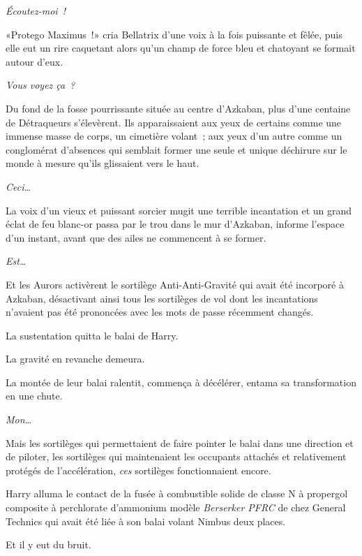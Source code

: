\emph{Écoutez-moi~!}

«Protego Maximus~!» cria Bellatrix d'une voix à la fois puissante et fêlée, puis elle eut un rire caquetant alors qu'un champ de force bleu et chatoyant se formait autour d'eux.

\emph{Vous voyez ça~?}

Du fond de la fosse pourrissante située au centre d'Azkaban, plus d'une centaine de Détraqueurs s'élevèrent. Ils apparaissaient aux yeux de certains comme une immense masse de corps, un cimetière volant~; aux yeux d'un autre comme un conglomérat d'absences qui semblait former une seule et unique déchirure sur le monde à mesure qu'ils glissaient vers le haut.

\emph{Ceci…}

La voix d'un vieux et puissant sorcier mugit une terrible incantation et un grand éclat de feu blanc-or passa par le trou dans le mur d'Azkaban, informe l'espace d'un instant, avant que des ailes ne commencent à se former.

\emph{Est…}

Et les Aurors activèrent le sortilège Anti-Anti-Gravité qui avait été incorporé à Azkaban, désactivant ainsi tous les sortilèges de vol dont les incantations n'avaient pas été prononcées avec les mots de passe récemment changés.

La sustentation quitta le balai de Harry.

La gravité en revanche demeura.

La montée de leur balai ralentit, commença à décélérer, entama sa transformation en une chute.

\emph{Mon…}

Mais les sortilèges qui permettaient de faire pointer le balai dans une direction et de piloter, les sortilèges qui maintenaient les occupants attachés et relativement protégés de l'accélération, \emph{ces} sortilèges fonctionnaient encore.


Harry alluma le contact de la fusée à combustible solide de classe N à propergol composite à perchlorate d'ammonium modèle \emph{Berserker PFRC} de chez General Technics qui avait été liée à son balai volant Nimbus  deux places.

Et il y eut du bruit.
